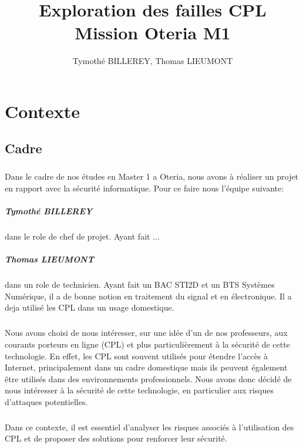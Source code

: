 \documentclass[a4paper,twocolumn]{report}
\title{\Huge{Exploration des failles CPL}\\Mission Oteria M1}
\author{Tymothé BILLEREY, Thomas LIEUMONT}
\date{}
\begin{document}
\maketitle
\newpage %
\newpage
{}
\tableofcontents
\pagebreak

\chapter{Contexte}

\section{Cadre}
\paragraph{}Dans le cadre de nos études en Master 1 a Oteria, nous avons à réaliser un projet en rapport avec la sécurité informatique. Pour ce faire nous l'équipe suivante: 

\paragraph{Tymothé BILLEREY} dans le role de chef de projet. Ayant fait ...

\paragraph{Thomas LIEUMONT} dans un role de technicien. Ayant fait un BAC STI2D et un BTS Systèmes Numérique, il a de bonne notion en traitement du signal et en électronique. Il a deja utilisé les CPL dans un usage domestique.

\paragraph{}Nous avons choisi de nous intéresser, sur une idée d'un de nos professeurs, aux courants porteurs en ligne (CPL) et plus particulièrement à la sécurité de cette technologie. En effet, les CPL sont souvent utilisés pour étendre l'accès à Internet, principalement dans un cadre domestique mais ils peuvent également être utilisés dans des environnements professionnels. Nous avons donc décidé de nous intéresser à la sécurité de cette technologie, en particulier aux risques d'attaques potentielles.

\paragraph{}Dans ce contexte, il est essentiel d'analyser les risques associés à l'utilisation des CPL et de proposer des solutions pour renforcer leur sécurité.
\end{document}

